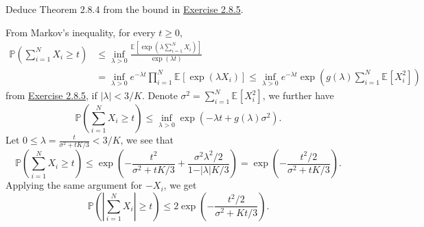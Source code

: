 \begin{problem*}[Exercise 2.8.6]\label{ex2.8.6}
	Deduce Theorem 2.8.4 from the bound in \hyperref[ex2.8.5]{Exercise 2.8.5}.
\end{problem*}
\begin{answer}
	From Markov's inequality, for every \(t \geq 0\),
	\[
		\begin{split}
			\mathbb{P} \left( \sum_{i=1}^{N} X_i \geq t\right)
			 & \leq \inf _{\lambda > 0} \frac{\mathbb{E}_{}\left[\exp (\lambda \sum_{i=1}^{N} X_i)\right] }{\exp (\lambda t)} \\
			 & = \inf _{\lambda  > 0} e^{-\lambda t} \prod_{i=1}^{N} \mathbb{E}_{}[\exp (\lambda X_i)]
			\leq \inf _{\lambda > 0} e^{-\lambda t} \exp (g(\lambda ) \sum_{i=1}^{N} \mathbb{E}_{}[X_i^2] )
		\end{split}
	\]
	from \hyperref[ex2.8.5]{Exercise 2.8.5}, if \(\vert \lambda \vert < 3 / K\). Denote \(\sigma ^2 = \sum_{i=1}^{N} \mathbb{E}_{}[X_i^2] \), we further have
	\[
		\mathbb{P} \left( \sum_{i=1}^{N} X_i \geq t\right)
		\leq \inf _{\lambda > 0} \exp (-\lambda t + g(\lambda ) \sigma ^2).
	\]
	Let \(0 \leq \lambda = \frac{t}{\sigma ^2 + t K / 3} < 3 / K\), we see that
	\[
		\mathbb{P} \left( \sum_{i=1}^{N} X_i \geq t \right)
		\leq \exp (- \frac{t^2}{\sigma ^2 + t K / 3} + \frac{\sigma ^2 \lambda ^2 / 2}{1 - \vert \lambda \vert K / 3})
		= \exp (- \frac{t^2 / 2}{\sigma ^2 + t K / 3}).
	\]
	Applying the same argument for \(-X_i\), we get
	\[
		\mathbb{P} \left( \left\vert \sum_{i=1}^{N} X_i \right\vert \geq t \right)
		\leq 2 \exp (- \frac{t^2 / 2}{\sigma ^2 + Kt / 3}).
	\]
\end{answer}